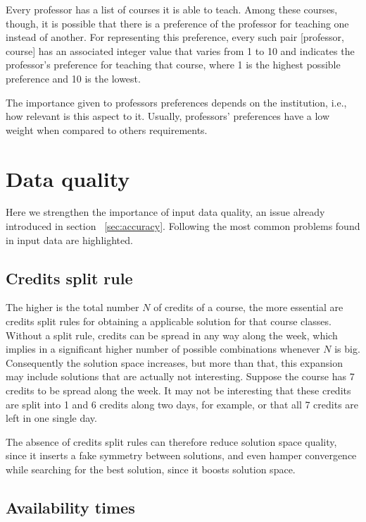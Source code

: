 Every professor has a list of courses it is able to teach. Among these courses, though, it is possible that there is a preference of the professor for teaching one instead of another. For representing this preference, every such pair [professor, course] has an associated integer value that varies from 1 to 10 and indicates the professor's preference for teaching that course, where 1 is the highest possible preference and 10 is the lowest.

The importance given to professors preferences depends on the institution, i.e., how relevant is this aspect to it. Usually, professors' preferences have a low weight when compared to others requirements.



\section{Data quality}

Here we strengthen the importance of input data quality, an issue already introduced in section ~\ref{sec:accuracy}. Following the most common problems found in input data are highlighted.

\subsection{Credits split rule}

The higher is the total number $N$ of credits of a course, the more essential are credits split rules for obtaining a applicable solution for that course classes. Without a split rule, credits can be spread in any way along the week, which implies in a significant higher number of possible combinations whenever $N$ is big. Consequently the solution space increases, but more than that, this expansion may include solutions that are actually not interesting. Suppose the course  has 7 credits to be spread along the week. It may not be interesting that these credits are split into 1 and 6 credits along two days, for example, or that all 7 credits are left in one single day.

The absence of credits split rules can therefore reduce solution space quality, since it inserts a fake symmetry between solutions, and even hamper convergence while searching for the best solution, since it boosts  solution space.


\subsection{Availability times}

